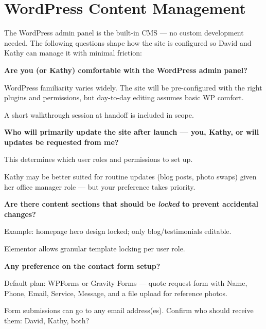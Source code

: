 \documentclass[11pt, letterpaper]{article}
\begin{document}
\section{WordPress Content Management}

The WordPress admin panel is the built-in CMS --- no custom development needed.
The following questions shape how the site is configured so David and Kathy can
manage it with minimal friction:

\begin{checklist}
  \item \textbf{Are you (or Kathy) comfortable with the WordPress admin panel?}
    \begin{checklist}
      \item WordPress familiarity varies widely. The site will be pre-configured
            with the right plugins and permissions, but day-to-day editing assumes
            basic WP comfort.
      \item A short walkthrough session at handoff is included in scope.
    \end{checklist}

  \item \textbf{Who will primarily update the site after launch --- you, Kathy,
        or will updates be requested from me?}
    \begin{checklist}
      \item This determines which user roles and permissions to set up.
      \item Kathy may be better suited for routine updates (blog posts, photo swaps)
            given her office manager role --- but your preference takes priority.
    \end{checklist}

  \item \textbf{Are there content sections that should be \emph{locked} to
        prevent accidental changes?}
    \begin{checklist}
      \item Example: homepage hero design locked; only blog/testimonials editable.
      \item Elementor allows granular template locking per user role.
    \end{checklist}

  \item \textbf{Any preference on the contact form setup?}
    \begin{checklist}
      \item Default plan: WPForms or Gravity Forms --- quote request form with
            Name, Phone, Email, Service, Message, and a file upload for reference photos.
      \item Form submissions can go to any email address(es). Confirm who should
            receive them: David, Kathy, both?
    \end{checklist}
\end{checklist}
\end{document}
